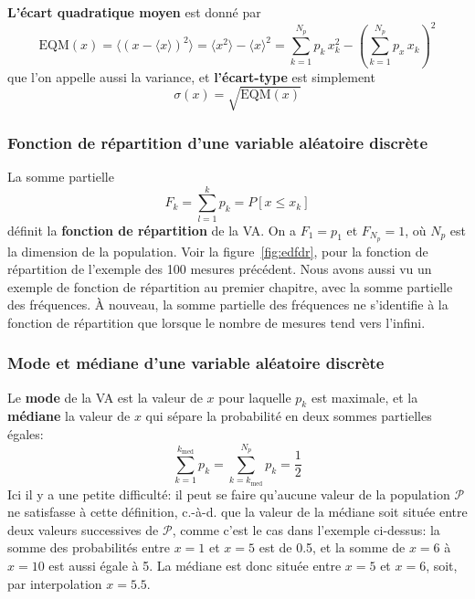 \documentclass[main.tex]{subfiles}
\begin{document}
\textbf{L'écart quadratique moyen} est donné par
\begin{equation}
    \text{EQM}(x)=\langle (x-\langle x\rangle)^2\rangle=\langle x^2\rangle-\langle x\rangle^2=\sum_{k=1}^{N_p}p_k\,x_k^2-\left(\sum_{k=1}^{N_p}p_x\,x_k\right)^2
\end{equation}
que l'on appelle aussi la variance, et \textbf{l'écart-type} est simplement
\begin{equation}
    \sigma(x)=\sqrt{\text{EQM}(x)}
\end{equation}

\subsubsection{Fonction de répartition d'une variable aléatoire discrète}

La somme partielle
\begin{equation}
    F_k=\sum_{l=1}^{k} p_k=P[x\le x_k]
\end{equation}
définit la \textbf{fonction de répartition} de la VA. On a $F_1=p_1$ et $F_{N_p}=1$, où $N_p$ est la dimension de la population. Voir la figure~\ref{fig:edfdr}, pour la fonction de répartition de l'exemple des 100 mesures précédent. Nous avons aussi vu un exemple de fonction de répartition au premier chapitre, avec la somme partielle des fréquences. À nouveau, la somme partielle des fréquences ne s'identifie à la fonction de répartition que lorsque le nombre de mesures tend vers l'infini.

\subsubsection{Mode et médiane d'une variable aléatoire discrète}

Le \textbf{mode} de la VA est la valeur de $x$ pour laquelle $p_k$ est maximale, et la \textbf{médiane} la valeur de $x$ qui sépare la probabilité en deux sommes partielles égales:
\begin{equation}
    \sum_{k=1}^{k_{\text{med}}}p_k=\sum_{k=k_{\text{med}}}^{N_p}p_k=\frac{1}{2}
\end{equation}
Ici il y a une petite difficulté: il peut se faire qu'aucune valeur de la population $\mathcal{P}$ ne satisfasse à cette définition, c.-à-d. que la valeur de la médiane soit située entre deux valeurs successives de $\mathcal{P}$, comme c'est le cas dans l'exemple ci-dessus: la somme des probabilités entre $x=1$ et $x=5$ est de 0.5, et la somme de $x=6$ à $x=10$ est aussi égale à 5. La médiane est donc située entre $x=5$ et $x=6$, soit, par interpolation $x=5.5$.
\end{document}
